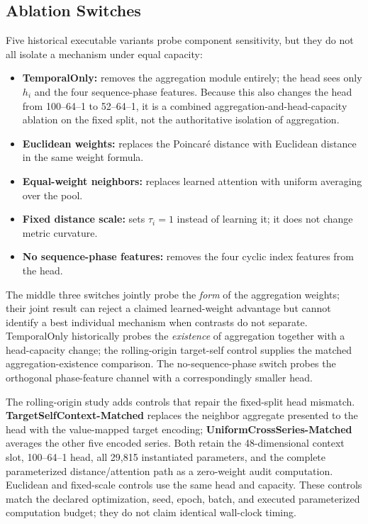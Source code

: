 \documentclass[electronics,article,submit,moreauthors]{Definitions/mdpi}
\providecommand{\tightlist}{\setlength{\itemsep}{0pt}\setlength{\parskip}{0pt}}
\begin{document}
\subsection{Ablation Switches}\label{ablation-switches}

Five historical executable variants probe component sensitivity, but they do not all isolate a mechanism under equal capacity:

\begin{itemize}
\tightlist
\item
  \textbf{TemporalOnly:} removes the aggregation module entirely; the head sees only \(h_i\) and the four sequence-phase features. Because this also changes the head from 100--64--1 to 52--64--1, it is a combined aggregation-and-head-capacity ablation on the fixed split, not the authoritative isolation of aggregation.
\item
  \textbf{Euclidean weights:} replaces the Poincar\'{e} distance with Euclidean distance in the same weight formula.
\item
  \textbf{Equal-weight neighbors:} replaces learned attention with uniform averaging over the pool.
\item
  \textbf{Fixed distance scale:} sets \(\tau_i=1\) instead of learning it; it does not change metric curvature.
\item
  \textbf{No sequence-phase features:} removes the four cyclic index features from the head.
\end{itemize}

The middle three switches jointly probe the \emph{form} of the aggregation weights; their joint result can reject a claimed learned-weight advantage but cannot identify a best individual mechanism when contrasts do not separate. TemporalOnly historically probes the \emph{existence} of aggregation together with a head-capacity change; the rolling-origin target-self control supplies the matched aggregation-existence comparison. The no-sequence-phase switch probes the orthogonal phase-feature channel with a correspondingly smaller head.

The rolling-origin study adds controls that repair the fixed-split head mismatch. \textbf{TargetSelfContext-Matched} replaces the neighbor aggregate presented to the head with the value-mapped target encoding; \textbf{UniformCrossSeries-Matched} averages the other five encoded series. Both retain the 48-dimensional context slot, 100--64--1 head, all 29,815 instantiated parameters, and the complete parameterized distance/attention path as a zero-weight audit computation. Euclidean and fixed-scale controls use the same head and capacity. These controls match the declared optimization, seed, epoch, batch, and executed parameterized computation budget; they do not claim identical wall-clock timing.
\end{document}
